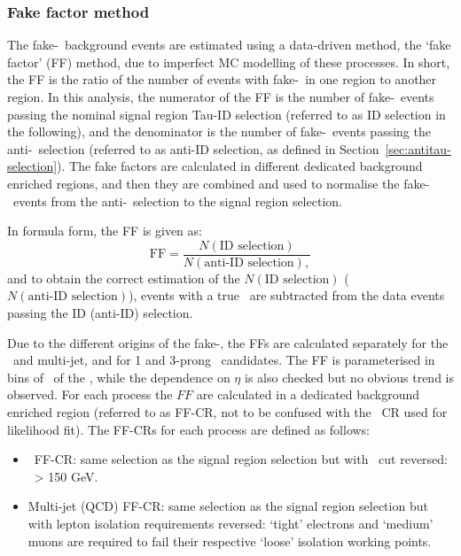 \subsubsection{Fake factor method}
The fake-\tauhad\ background events
are estimated using a data-driven method, the `fake factor' (FF) method, 
due to imperfect MC modelling of these processes.
In short, the FF is the ratio of 
the number of events with fake-\tauhad\ in one region to another region.
In this analysis, 
the numerator of the FF is the number of fake-\tauhad\ events 
passing the nominal signal region Tau-ID selection 
(referred to as ID selection in the following), 
and the denominator is the number of fake-\tauhad\ events passing the
anti-\tauhad\ selection (referred to as anti-ID selection, 
as defined in Section~\ref{sec:antitau-selection}). 
The fake factors are calculated in different dedicated background enriched regions, 
and then they are combined and used to normalise the fake-\tauhad\ events from the 
anti-\tauhad\ selection to the signal region selection. 

In formula form, the FF is given as:
\begin{equation}
\mathrm{FF} =  \frac{N(\text{ID\ selection})}{N(\text{anti-ID\ selection}),} 
\end{equation} 
and to obtain the correct estimation of the 
$N(\text{ID\ selection})$ ($N(\text{anti-ID\ selection})$),
events with a true \tauhad\ are subtracted from the data events
passing the ID (anti-ID) selection.

Due to the different origins of the fake-\tauhad, the FFs are
calculated separately for the \ttbar\ and multi-jet, 
and for 1 and 3-prong \tauhad\ candidates.
The FF is parameterised in bins of \pt\ of the \tauhad, while the 
dependence on $\eta$ is also checked but no obvious trend is observed.
For each process the $FF$ are calculated in 
a dedicated background enriched region (referred to as FF-CR,
not to be confused with the \ZHF\ CR used for likelihood fit). 
The FF-CRs for each process are defined as follows:
\begin{itemize}
\item \ttbar\ FF-CR: same selection as the signal region selection 
but with \mbb\ cut reversed: \mbb\ > 150 GeV.
\item Multi-jet (QCD) FF-CR: same selection as the signal region selection but with 
lepton isolation requirements reversed: `tight' electrons and `medium' muons 
are required to fail their respective `loose' isolation working points.
\end{itemize}

